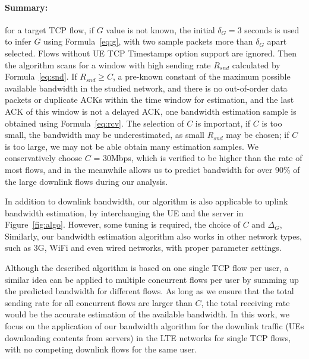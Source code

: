 \paragraph{Summary: } for a target TCP flow, if $G$ value is not known, the initial $\delta_{G} = 3$ seconds is used to infer $G$ using Formula~\ref{eq:g}, with two sample packets more than $\delta_{G}$ apart selected. Flows without UE TCP Timestamps option support are ignored. Then the algorithm scans for a window with high sending rate $R_{snd}$ calculated by Formula~\ref{eq:snd}. If $R_{snd} \geq C$, a pre-known constant of the maximum possible available bandwidth in the studied network, and there is no out-of-order data packets or duplicate ACKs within the time window for estimation, and the last ACK of this window is not a delayed ACK, one bandwidth estimation sample is obtained using Formula~\ref{eq:rcv}. The selection of $C$ is important, \ie if $C$ is too small, the bandwidth may be underestimated, as small $R_{snd}$ may be chosen; if $C$ is too large, we may not be able obtain many estimation samples. We conservatively choose $C$ = 30Mbps, which is verified to be higher than the rate of most flows, and in the meanwhile allows us to predict bandwidth for over 90\% of the large downlink flows during our analysis.


In addition to downlink bandwidth, our algorithm is also applicable to uplink bandwidth estimation, by interchanging the UE and the server in Figure~\ref{fig:algo}. However, some tuning is required, \eg the choice of $C$ and $\Delta_{G}$, \etc Similarly, our bandwidth estimation algorithm also works in other network types, such as 3G, WiFi and even wired networks, with proper parameter settings.

Although the described algorithm is based on one single TCP flow per user, a similar idea can be applied to multiple concurrent flows per user by summing up the predicted bandwidth for different flows. As long as we ensure that the total sending rate for all concurrent flows are larger than $C$, the total receiving rate would be the accurate estimation of the available bandwidth. In this work, we focus on the application of our bandwidth algorithm for the downlink traffic (UEs downloading contents from servers) in the LTE networks for single TCP flows, \ie with no competing downlink flows for the same user.

